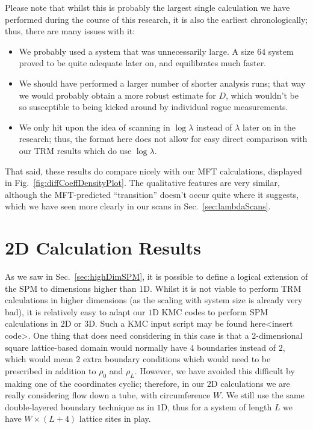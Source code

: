 Please note that whilst this is probably the largest single calculation we have performed during the 
course of this research, it is also the earliest chronologically; thus, there are many issues
with it:
\begin{itemize}
 \item We probably used a system that was unnecessarily large. A size $64$ system proved to be quite adequate
 later on, and equilibrates much faster.
 \item We should have performed a larger number of shorter analysis runs; that way we would
 probably obtain a more robust estimate for $D$, which wouldn't be so susceptible to being
 kicked around by individual rogue measurements.
 \item We only hit upon the idea of scanning in $\log \lambda$ instead of $\lambda$ later on
 in the research; thus, the format here does not allow for easy direct comparison with our TRM
 results which do use $\log \lambda$. 
\end{itemize}
That said, these results do compare nicely with our MFT calculations, displayed in 
Fig.~\ref{fig:diffCoeffDensityPlot}. The qualitative features are very similar, although the
MFT-predicted ``transition'' doesn't occur quite where it suggests, which we have seen  
more clearly in our scans in Sec.~\ref{sec:lambdaScans}.

\section{2D Calculation Results}
As we saw in Sec.~\ref{sec:highDimSPM}, it is possible to define a logical extension of the SPM
to dimensions higher than $1$D. Whilst it is not viable to perform TRM calculations in higher 
dimensions (as the scaling with system size is already very bad), it is relatively easy to adapt
our $1$D KMC codes to perform SPM calculations in $2$D or $3$D. Such a KMC input script may be found
here<insert code>. One thing that does need considering in this case is that a 2-dimensional square
lattice-based domain would normally have $4$ boundaries instead of $2$, which would mean $2$ extra
boundary conditions which would need to be prescribed in addition to $\rho_0$ and $\rho_L$.
However, we have avoided this difficult by making one of the coordinates cyclic; therefore, in our
$2$D calculations we are really considering flow down a tube, with circumference $W$. We still
use the same double-layered boundary technique as in $1$D, thus for a system of length $L$
we have $W \times (L+4)$ lattice sites in play.


